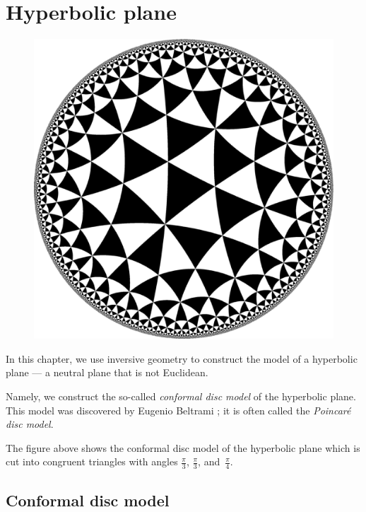 \chapter{Hyperbolic plane}\label{chap:poincare}

\begin{figure}[!ht]
\vspace*{-9mm}
\centering
\includegraphics[scale=0.25]{pics/H2checkers_334}
\end{figure}

In this chapter, we use inversive geometry 
to construct the model of a hyperbolic plane --- a neutral plane that is not Euclidean.

Namely, we construct the so-called \emph{conformal disc model} of the hyperbolic plane.
This model was discovered by Eugenio Beltrami \cite{beltrami}; 
it is often called the {}\emph{Poincar\'e disc model}. 

The figure above shows the conformal disc model of the hyperbolic plane which is cut into congruent triangles with angles $\tfrac\pi3$, $\tfrac\pi3$, and~$\tfrac\pi4$.

\section*{Conformal disc model}

